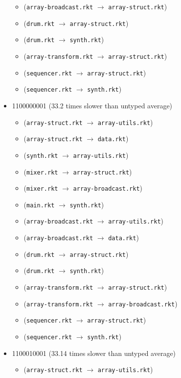 \documentclass{article}
\newcommand{\mono}[1]{\texttt{#1}}
\begin{document}
\begin{itemize}
\begin{itemize}
  \item (\mono{array-broadcast.rkt} $\rightarrow$ \mono{array-struct.rkt})
  \item (\mono{drum.rkt} $\rightarrow$ \mono{array-struct.rkt})
  \item (\mono{drum.rkt} $\rightarrow$ \mono{synth.rkt})
  \item (\mono{array-transform.rkt} $\rightarrow$ \mono{array-struct.rkt})
  \item (\mono{sequencer.rkt} $\rightarrow$ \mono{array-struct.rkt})
  \item (\mono{sequencer.rkt} $\rightarrow$ \mono{synth.rkt})
  \end{itemize}
\item 1100000001 (33.2 times slower than untyped average)
  \begin{itemize}
  \item (\mono{array-struct.rkt} $\rightarrow$ \mono{array-utils.rkt})
  \item (\mono{array-struct.rkt} $\rightarrow$ \mono{data.rkt})
  \item (\mono{synth.rkt} $\rightarrow$ \mono{array-utils.rkt})
  \item (\mono{mixer.rkt} $\rightarrow$ \mono{array-struct.rkt})
  \item (\mono{mixer.rkt} $\rightarrow$ \mono{array-broadcast.rkt})
  \item (\mono{main.rkt} $\rightarrow$ \mono{synth.rkt})
  \item (\mono{array-broadcast.rkt} $\rightarrow$ \mono{array-utils.rkt})
  \item (\mono{array-broadcast.rkt} $\rightarrow$ \mono{data.rkt})
  \item (\mono{drum.rkt} $\rightarrow$ \mono{array-struct.rkt})
  \item (\mono{drum.rkt} $\rightarrow$ \mono{synth.rkt})
  \item (\mono{array-transform.rkt} $\rightarrow$ \mono{array-struct.rkt})
  \item (\mono{array-transform.rkt} $\rightarrow$ \mono{array-broadcast.rkt})
  \item (\mono{sequencer.rkt} $\rightarrow$ \mono{array-struct.rkt})
  \item (\mono{sequencer.rkt} $\rightarrow$ \mono{synth.rkt})
  \end{itemize}
\item 1100010001 (33.14 times slower than untyped average)
  \begin{itemize}
  \item (\mono{array-struct.rkt} $\rightarrow$ \mono{array-utils.rkt})

\end{itemize}
\end{itemize}
\end{document}
